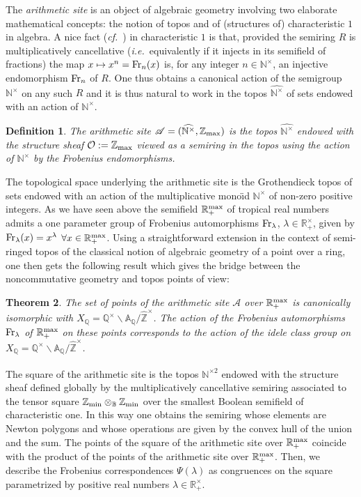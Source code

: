 \documentclass[12pt]{article}
\newtheorem{thm}{Theorem}[section]
\newtheorem{defn}[thm]{Definition}
\def\A{{\mathbb A}}
\def\B{{\mathbb B}}
\def\N{{\mathbb N}}
\def\Q{{\mathbb Q}}
\def\R{{\mathbb R}}
\def\Z{{\mathbb Z}}
\def\aarith{{\mathscr A}}
\def\hatz{{\hat\Z^\times}}
\def\cO{{\mathcal O}}
\newcommand{\ie}{{\it i.e.\/}\ }
\newcommand{\cf}{{\it cf.}}
\def\zmin{\Z_{\rm min}}
\def\mc{multiplicatively cancellative }
\def\zmax{{\Z_{\rm max}}}
\def\rmax{\R_+^{\rm max}}
\def\fr{{\rm Fr}}
\def\arith{{(\wnt,\bar \N)}}
\def\nt{\N^{\times}}
\def\wnt{{\widehat{\N^{\times}}}}
\def\nbo{{\zmin\otimes_\B \zmin}}
\def\arith{{(\wnt,\zmax)}}
\def\wntb{{\widehat{\N^{\times 2}}}}
\begin{document}
The  {\em arithmetic site} \cite{CC,CCas1} is an object  of algebraic geometry involving two elaborate mathematical concepts: the notion of topos and of (structures of) characteristic $1$ in algebra. 
A nice fact (\cf~\cite{Golan}) in characteristic $1$ is that, provided the semiring $R$ is \mc (\ie equivalently if it injects in its semifield of fractions) the map $x\mapsto x^n=\fr_n(x)$ is, for any integer $n\in \nt$, an injective endomorphism $\fr_n$ of $R$. One thus obtains a canonical action of the semigroup $\nt$ on any such $R$ and it is thus natural to work in the topos $\wnt$ of sets endowed with an action of $\nt$. 
\begin{defn}\label{site} The arithmetic site $\aarith=\arith$ is the topos $\wnt$
endowed with the  {\em structure sheaf} $\cO:=\zmax$ viewed as a semiring in the topos using the action of $\nt$ by the Frobenius endomorphisms.
\end{defn}
 The topological space underlying the arithmetic site is the Grothendieck topos of sets endowed with an action of  the multiplicative mono\"{\i}d $\nt$ of non-zero positive integers. 
 As we have seen above the semifield $\rmax$ of tropical real numbers   admits a one parameter group of  Frobenius
automorphisms $\fr_\lambda$, $\lambda\in \R_+^\times$, given by $\fr_\lambda(x)=x^\lambda$ $\forall x\in \rmax$. 
Using a straightforward extension in the context of semi-ringed topos of the classical notion of algebraic geometry of a point over a ring, one then gets the following result which gives the bridge between the noncommutative geometry and topos points of view:
\begin{thm}\cite{CC,CCas1} \label{structure3z} The set of points of the arithmetic site  $\aarith$ over $\rmax$ is canonically isomorphic with $X_\Q=\Q^\times\backslash \A_\Q/\hatz$. The action of the Frobenius
automorphisms $\fr_\lambda$ of $\rmax$ on these points corresponds to the action of the idele class group on $X_\Q=\Q^\times\backslash \A_\Q/\hatz$.
\end{thm}
The square of the arithmetic site is the topos $\wntb$ endowed with the structure sheaf defined globally by the multiplicatively cancellative semiring associated to the tensor square $\nbo$ over the  smallest Boolean semifield of characteristic one.  In this way one obtains the semiring whose elements are Newton polygons and whose operations are given by the convex hull of the union and the sum. The points of the  square of the arithmetic site over $\rmax$ coincide with the product of the points of the  arithmetic site over $\rmax$. Then, we describe the Frobenius correspondences $\Psi(\lambda)$ as congruences on the square parametrized by positive real numbers $\lambda\in \R_+^\times$.
 
\end{document}

